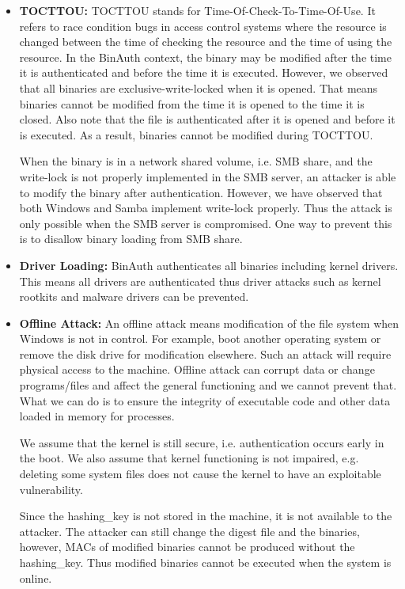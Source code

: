 \begin{itemize}
\item {\bf TOCTTOU:}
TOCTTOU stands for Time-Of-Check-To-Time-Of-Use.
It refers to race condition bugs in access control systems
where the resource is changed between the time
of checking the resource and the time of using the resource.
In the BinAuth context, the binary may be modified
after the time it is authenticated and before the time it is executed.
However, we observed that all binaries are exclusive-write-locked
when it is opened.
That means binaries cannot be modified from the time it is opened
to the time it is closed.
Also note that the file is authenticated after it is opened and before
it is executed.
As a result, binaries cannot be modified during TOCTTOU.

When the binary is in a network shared volume, i.e. SMB share,
and the write-lock is not properly implemented in the SMB server,
an attacker is able to modify the binary after authentication.
However, we have observed that both Windows and Samba
implement write-lock properly.
Thus the attack is only possible when the SMB server is compromised.
One way to prevent this is to disallow binary loading from SMB share.

\item {\bf Driver Loading:}
BinAuth authenticates all binaries including kernel drivers.
This means all drivers are authenticated thus driver attacks such as
kernel rootkits and malware drivers can be prevented.

\item {\bf Offline Attack:}
An offline attack means modification of the file system when Windows is
not in control.
For example, boot another operating system or remove the disk drive for
modification elsewhere. Such an attack will require physical access
to the machine. Offline attack can corrupt data or change programs/files
and affect the general functioning and we cannot prevent that.
What we can do is to ensure the integrity of executable code and other data
loaded in memory for processes.

We assume that the kernel is still secure, i.e. authentication occurs early
in the boot.
We also assume that kernel functioning is not impaired, e.g. deleting some
system files does not cause the kernel to have an exploitable vulnerability.

Since the hashing\_key is not stored in the machine, it is not available
to the attacker.
The attacker can still change the digest file and the binaries,
however, MACs of modified binaries cannot be produced without the hashing\_key.
Thus modified binaries cannot be executed when the system is online.
\end{itemize}
